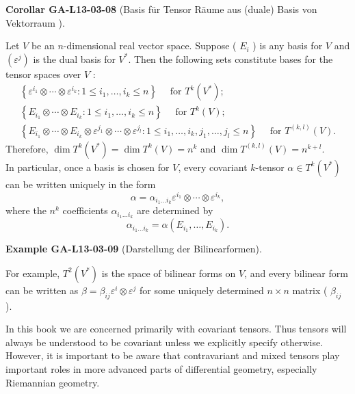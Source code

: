 \documentclass[10pt, letterpaper]{article}
\newcommand{\CustomHeading}[3]{%
  \par\medskip\noindent%
  \textbf{#1 #2} \textnormal{(#3)}.\enskip%
}
\newenvironment{KORO}[2]{\begin{unitbox}\CustomHeading{Corollar}{#1}{#2}}{\end{unitbox}}
\newenvironment{EXA}[2]{\begin{unitbox}\CustomHeading{Example}{#1}{#2}}{\end{unitbox}}
\begin{document}
\begin{KORO}{GA-L13-03-08}{Basis für Tensor Räume aus (duale) Basis von Vektorraum }
Let $V$ be an $n$-dimensional real vector space. Suppose ( $E_{i}$ ) is any basis for $V$ and $\left(\varepsilon^{j}\right)$ is the dual basis for $V^{*}$. Then the following sets constitute bases for the tensor spaces over $V$ :
$$
\begin{gathered}
\left\{\varepsilon^{i_{1}} \otimes \cdots \otimes \varepsilon^{i_{k}}: 1 \leq i_{1}, \ldots, i_{k} \leq n\right\} \quad \text { for } T^{k}\left(V^{*}\right) ; \\
\left\{E_{i_{1}} \otimes \cdots \otimes E_{i_{k}}: 1 \leq i_{1}, \ldots, i_{k} \leq n\right\} \quad \text { for } T^{k}(V) ; \\
\left\{E_{i_{1}} \otimes \cdots \otimes E_{i_{k}} \otimes \varepsilon^{j_{1}} \otimes \cdots \otimes \varepsilon^{j_{l}}: 1 \leq i_{1}, \ldots, i_{k}, j_{1}, \ldots, j_{l} \leq n\right\} \quad \text { for } T^{(k, l)}(V) .
\end{gathered}
$$
Therefore, $\operatorname{dim} T^{k}\left(V^{*}\right)=\operatorname{dim} T^{k}(V)=n^{k}$ and $\operatorname{dim} T^{(k, l)}(V)=n^{k+l}$.\\
In particular, once a basis is chosen for $V$, every covariant $k$-tensor $\alpha \in T^{k}\left(V^{*}\right)$ can be written uniquely in the form
$$
\alpha=\alpha_{i_{1} \ldots i_{k}} \varepsilon^{i_{1}} \otimes \cdots \otimes \varepsilon^{i_{k}},
$$
where the $n^{k}$ coefficients $\alpha_{i_{1} \ldots i_{k}}$ are determined by
$$
\alpha_{i_{1} \ldots i_{k}}=\alpha\left(E_{i_{1}}, \ldots, E_{i_{k}}\right) .
$$
\end{KORO}


\begin{EXA}{GA-L13-03-09}{Darstellung der Bilinearformen}
For example, $T^{2}\left(V^{*}\right)$ is the space of bilinear forms on $V$, and every bilinear form can be written as $\beta=\beta_{i j} \varepsilon^{i} \otimes \varepsilon^{j}$ for some uniquely determined $n \times n$ matrix ( $\beta_{i j}$ ).
\end{EXA}

In this book we are concerned primarily with covariant tensors. Thus tensors will always be understood to be covariant unless we explicitly specify otherwise. However, it is important to be aware that contravariant and mixed tensors play important roles in more advanced parts of differential geometry, especially Riemannian geometry.


\pagebreak
\end{document}
